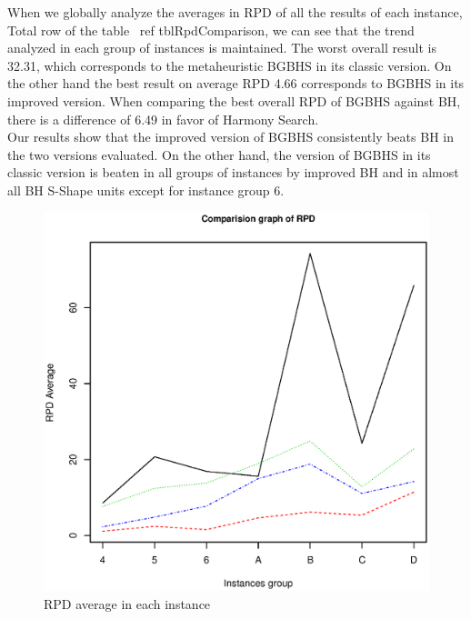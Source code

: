 When we globally analyze the averages in RPD of all the results of each instance, Total row of the table \ ref {tblRpdComparison}, we can see that the trend analyzed in each group of instances is maintained.
The worst overall result is 32.31, which corresponds to the metaheuristic BGBHS in its classic version. On the other hand the best result on average RPD 4.66 corresponds to BGBHS in its improved version. When comparing the best overall RPD of BGBHS against BH, there is a difference of 6.49 in favor of Harmony Search.\\

Our results show that the improved version of BGBHS consistently beats BH in the two versions evaluated. On the other hand, the version of BGBHS in its classic version is beaten in all groups of instances by improved BH and in almost all BH S-Shape units except for instance group 6.\\

\begin{figure}[H]
\centering
\includegraphics[scale=.55]{Conclusion/comparisionGraph.eps}
\caption{RPD average in each instance}
\label{fig:RPDAverage}
\end{figure}



